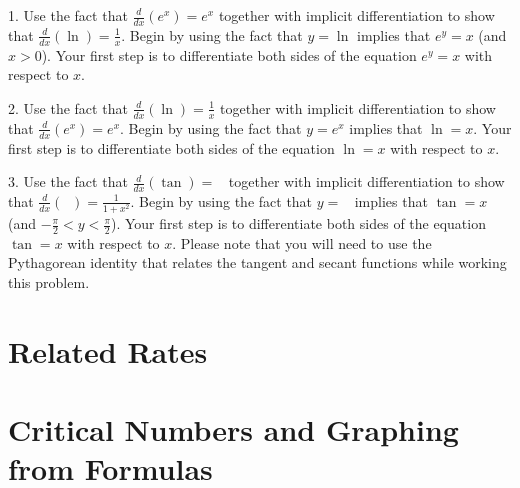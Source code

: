 \documentclass[12pt,]{book}
\newcommand{\lt}{<}
\theoremstyle{plain}
\theoremstyle{definition}
\numberwithin{equation}{section}
\providecommand\phantomsection{}
\newcommand{\fe}[2]{\mathop{{#1}{\left(#2\right)}}}
\newcommand{\lzoo}[2]{{\frac{d}{d#1}}{\left(#2\right)}}
\begin{document}
\begin{exerciselist}
\item[1.]\phantomsection\hypertarget{exercise-389}{\null}Use the fact that \(\lzoo{x}{e^x}=e^x\) together with implicit differentiation to show that \(\lzoo{x}{\fe{\ln}{x}}=\frac{1}{x}\). Begin by using the fact that \(y=\fe{\ln}{x}\) implies that \(e^y=x\) (and \(x>0\)).  Your first step is to differentiate both sides of the equation \(e^y=x\) with respect to \(x\).%
\par\smallskip
\item[2.]\phantomsection\hypertarget{exercise-390}{\null}Use the fact that \(\lzoo{x}{\fe{\ln}{x}}=\frac{1}{x}\) together with implicit differentiation to show that \(\lzoo{x}{e^x}=e^x\). Begin by using the fact that \(y=e^x\) implies that \(\fe{\ln}{y}=x\).  Your first step is to differentiate both sides of the equation \(\fe{\ln}{y}=x\) with respect to \(x\).%
\par\smallskip
\item[3.]\phantomsection\hypertarget{exercise-391}{\null}Use the fact that \(\lzoo{x}{\fe{\tan}{x}}=\fe{\sec^2}{x}\) together with implicit differentiation to show that \(\lzoo{x}{\fe{\tan^{-1}}{x}}=\frac{1}{1+x^2}\).  Begin by using the fact that \(y=\fe{\tan^{-1}}{x}\) implies that \(\fe{\tan}{y}=x\) (and \(-\frac{\pi}{2}\lt y\lt\frac{\pi}{2}\)).  Your first step is to differentiate both sides of the equation \(\fe{\tan}{y}=x\) with respect to \(x\).  Please note that you will need to use the Pythagorean identity that relates the tangent and secant functions while working this problem.%
\par\smallskip
\end{exerciselist}
\typeout{************************************************}
\typeout{************************************************}
\chapter[Related Rates]{Related Rates}\label{chapter-related-rates}
\typeout{************************************************}
\typeout{************************************************}
\chapter[Critical Numbers and Graphing from Formulas]{Critical Numbers and Graphing from Formulas}\label{chapter-critical-numbers-graphing-from-formulas}
\typeout{************************************************}
\typeout{************************************************}
\end{document}
